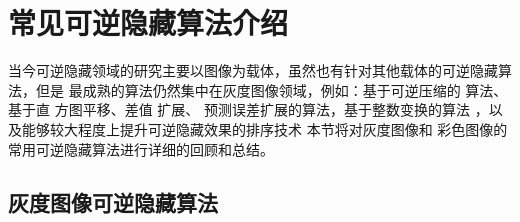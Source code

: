 ﻿\chapter{常见可逆隐藏算法介绍}
\label{chap:related_intro}
当今可逆隐藏领域的研究主要以图像为载体，虽然也有针对其他载体的可逆隐藏算法，但是
最成熟的算法仍然集中在灰度图像领域，例如：基于可逆压缩的
算法\cite{fridrich2001invertible,celik2005lossless}、基于直
方图平移\cite{ni2006reversible,lee2006reversiblee,li2013general}、差值
扩展\cite{tian2003reversible,alattar2003reversible,alattar2004reversible,alattar2004reversible}、
预测误差扩展的算法\cite{thodi2007expansion}，基于整数变换的算法
\cite{coltuc2007very,chen2010reversible,wang2010efficient,peng2012adaptive}，以
及能够较大程度上提升可逆隐藏效果的排序技术
\cite{kamstra2005reversible,sachnev2009reversible}本节将对灰度图像和
彩色图像的常用可逆隐藏算法进行详细的回顾和总结。



\section{灰度图像可逆隐藏算法}
